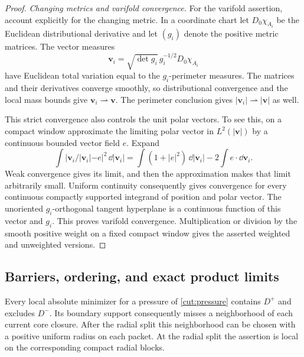 \begin{proof}
\emph{Changing metrics and varifold convergence.}
For the varifold assertion, account explicitly for the changing metric.
In a coordinate chart let $D_0\chi_{A_i}$ be the
Euclidean distributional derivative and let $(g_i)$ denote the positive
metric matrices.  The vector measures
\[
      \mathbf v_i=\sqrt{\det g_i}\,g_i^{-1/2}D_0\chi_{A_i}
\]
have Euclidean total variation equal to the $g_i$-perimeter measures.
The matrices and their derivatives converge smoothly, so distributional
convergence and the local mass bounds give $\mathbf v_i\rightharpoonup
\mathbf v$.  The perimeter conclusion gives
$|\mathbf v_i|\rightharpoonup|\mathbf v|$ as well.

This strict convergence also controls the unit polar vectors.  To see
this, on a compact window approximate the limiting polar vector in
$L^2(|\mathbf v|)$ by a continuous bounded vector field $e$.
Expand
\[
 \int|\mathbf v_i/|\mathbf v_i|-e|^2\,\dd|\mathbf v_i|
 =\int(1+|e|^2)\,\dd|\mathbf v_i|-2\int e\cdot\dd\mathbf v_i.
\]
Weak convergence gives its limit, and then the approximation makes that
limit arbitrarily small.  Uniform continuity consequently gives
convergence for every continuous compactly supported integrand of
position and polar vector.  The unoriented $g_i$-orthogonal tangent
hyperplane is a continuous function of this vector and $g_i$.
This proves varifold convergence.  Multiplication or division by the
smooth positive weight on a fixed compact window gives the asserted
weighted and unweighted versions.
\end{proof}

\subsection{Barriers, ordering, and exact product limits}

\begin{lemma}\label{cut:barriers}
Every local absolute minimizer for a pressure of
\cref{cut:pressure} contains $D^+$ and excludes $D^-$.  Its boundary
support consequently misses a neighborhood of each current core closure.
After the radial split this neighborhood can be chosen with a positive
uniform radius on each packet.  At the radial split the assertion is
local on the corresponding compact radial blocks.
\end{lemma}

